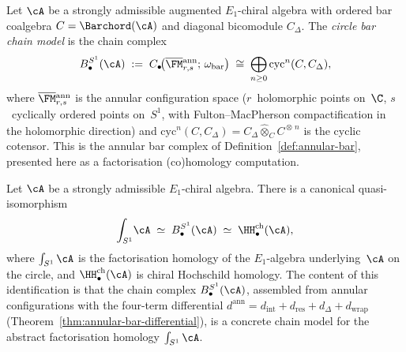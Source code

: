 \begin{definition}%
\ClaimStatusProvedHere
\label{def:circle-bar-chain-model}%
%
%
%
Let $\cA$ be a strongly admissible augmented
$E_1$-chiral algebra with ordered bar coalgebra
$C=\Barchord(\cA)$ and diagonal bicomodule
$C_\Delta$. The \emph{circle bar chain model} is the
chain complex
\[
B^{S^1}_\bullet(\cA)
\;:=\;
C_\bullet\!\bigl(
\overline{\FM}{}^{\mathrm{ann}}_{r,s};\,
\omega_{\mathrm{bar}}
\bigr)
\;\cong\;
\bigoplus_{n\ge 0}
\mathrm{cyc}^n(C,C_\Delta),
\]
where $\overline{\FM}{}^{\mathrm{ann}}_{r,s}$ is the
annular configuration space
($r$~holomorphic points on~$\C$,
$s$~cyclically ordered points on~$S^1$, with
Fulton--MacPherson compactification in the
holomorphic direction) and
$\mathrm{cyc}^n(C,C_\Delta)=
C_\Delta\widehat\otimes_C C^{\widehat\otimes\,n}$ is
the cyclic cotensor.
This is the annular bar complex of
Definition~\textup{\ref{def:annular-bar}}, presented
here as a factorisation (co)homology computation.
\end{definition}

\begin{theorem}%
\label{thm:S1-factorisation-homology}%
%
Let $\cA$ be a strongly admissible $E_1$-chiral
algebra. There is a canonical quasi-isomorphism
\begin{equation}\label{eq:S1-fact-hom}
\int_{S^1}\!\cA
\;\simeq\;
B^{S^1}_\bullet(\cA)
\;\simeq\;
\HH^{\mathrm{ch}}_\bullet(\cA),
\end{equation}
where $\int_{S^1}\cA$ is the factorisation homology
of the $E_1$-algebra underlying~$\cA$ on the circle,
and $\HH^{\mathrm{ch}}_\bullet(\cA)$ is chiral
Hochschild homology.
The content of this identification is that the
chain complex
$B^{S^1}_\bullet(\cA)$, assembled from
annular configurations with the four-term
differential
$d^{\mathrm{ann}}=d_{\mathrm{int}}+d_{\mathrm{res}}
+d_\Delta+d_{\mathrm{wrap}}$
\textup{(}Theorem~\textup{\ref{thm:annular-bar-differential}}\textup{)},
is a concrete chain model for the abstract
factorisation homology $\int_{S^1}\cA$.
\end{theorem}

